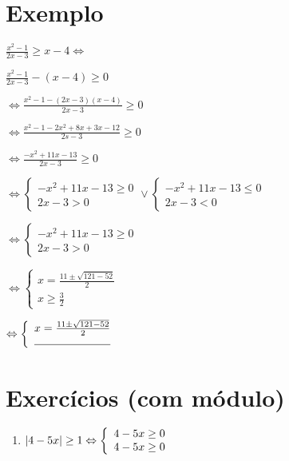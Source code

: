 \documentclass[12pt]{report}
\begin{document}
\section{Exemplo}

  \centering\Large
  $\frac{x^2-1}{2x-3} \ge x-4 \Leftrightarrow$
  \vspace{5mm}

  $\frac{x^2-1}{2x-3} - (x-4) \ge 0 $
  \vspace{5mm}

  $\Leftrightarrow\frac{x^2-1-(2x-3)(x-4)}{2x-3} \ge 0$
  \vspace{5mm}

  $\Leftrightarrow\frac{x^2-1-2x^2+8x+3x-12}{2s-3} \ge 0$
  \vspace{5mm}

  $\Leftrightarrow\frac{-x^2+11x-13}{2x-3} \ge 0$
  \vspace{5mm}

  $\Leftrightarrow\left\{\begin{array}{rcl}
    -x^2+11x-13 \ge 0\\
    2x-3 > 0
    \end{array}\right.
    \vee
    \left\{\begin{array}{rcl}
      -x^2+11x-13 \le 0 \\
      2x-3 < 0
      \end{array}\right.$
  \vspace{5mm}

  $\Leftrightarrow\left\{\begin{array}{rcl}
    -x^2+11x-13 \ge 0\\
    2x-3 > 0
    \end{array}\right.$
  \vspace{5mm}

  $\Leftrightarrow\left\{\begin{array}{rcl}
    x = \frac{11 \pm \sqrt{121-52}}2\\
    x \ge \frac{3}2
    \end{array}\right.$
  \vspace{5mm}

  $\Leftrightarrow\left\{\begin{array}{rcl}
    x = \frac{11 \pm \sqrt{121-52}}2\\
    \hrulefill
    \end{array}\right.$
  \vspace{5mm}
  
  \justifying

\section{Exercícios (com módulo)}

\centering
\begin{enumerate}
  \item \centering\Large $\left|4-5x\right| \ge 1  \Leftrightarrow\left\{\begin{array}{rcl}
    4-5x \ge 0 \\
    4-5x \ge 0
    \hrulefill
    \end{array}\right.$
    \vspace{5mm}
\end{enumerate}
\justifying
\end{document}
